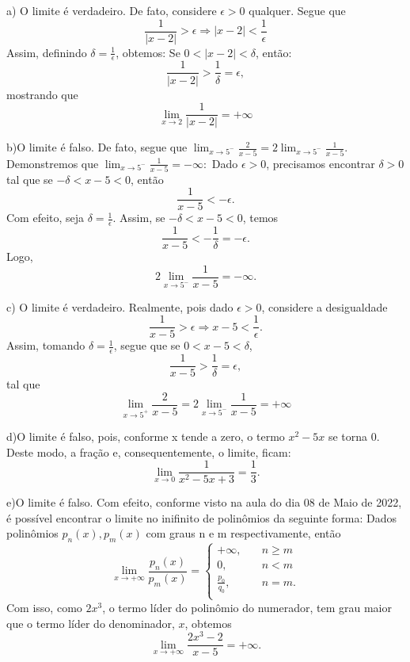 \documentclass[exercícios_de_cálculo.tex]{subfiles}
\begin{document}
\begin{sol*}
	a) O limite é verdadeiro. De fato, considere $\epsilon > 0$ qualquer. Segue que
	$$
		\frac{1}{|x - 2|} > \epsilon \Rightarrow |x - 2| < \frac{1}{\epsilon}
	$$
	Assim, definindo $\delta = \frac{1}{\epsilon}$, obtemos: Se $0 < |x - 2| < \delta$, então:
	$$
		\frac{1}{|x - 2|} > \frac{1}{\delta} = \epsilon,
	$$
	mostrando que
	$$
		\lim_{x\to2}\frac{1}{|x - 2|}=+\infty
	$$

	b)O limite é falso. De fato, segue que  $\lim_{x\to5^-}\frac{2}{x - 5} = 2\lim_{x\to5^-}\frac{1}{x - 5}.$ Demonstremos que $\lim_{x\to5^-}\frac{1}{x - 5} = -\infty:$ Dado $\epsilon > 0$, precisamos encontrar $\delta > 0$ tal que se $-\delta < x - 5< 0$, então
	$$
		\frac{1}{x - 5} < -\epsilon.
	$$
	Com efeito, seja $\delta = \frac{1}{\epsilon}.$ Assim, se $-\delta < x - 5< 0$, temos
	$$
		\frac{1}{x - 5} < -\frac{1}{\delta} = -\epsilon.
	$$
	Logo,
	$$
		2\lim_{x\to5^-}\frac{1}{x - 5} = -\infty.
	$$

	c) O limite é verdadeiro. Realmente, pois dado $\epsilon > 0$, considere a desigualdade
	$$
		\frac{1}{x - 5} > \epsilon \Rightarrow x - 5 < \frac{1}{\epsilon}.
	$$
	Assim, tomando $\delta = \frac{1}{\epsilon}$, segue que se $0 < x - 5 < \delta$,
	$$
		\frac{1}{x - 5} > \frac{1}{\delta} = \epsilon,
	$$
	tal que
	$$
		\lim_{x\to5^+}\frac{2}{x - 5} = 2\lim_{x\to5^-}\frac{1}{x - 5} = +\infty
	$$

	d)O limite é falso, pois, conforme x tende a zero, o termo $x^2 - 5x$ se torna 0. Deste modo, a fração e, consequentemente, o limite, ficam:
	$$
		\lim_{x\to0}\frac{1}{x^2 - 5x + 3} = \frac{1}{3}.
	$$

	e)O limite é falso. Com efeito, conforme visto na aula do dia 08 de Maio de 2022, é possível encontrar o limite no inifinito de polinômios da seguinte forma: Dados polinômios $p_n(x), p_m(x)$ com graus n e m respectivamente, então
	$$
		\lim_{x\to+\infty}\frac{p_n(x)}{p_m(x)} =
		\left\{\begin{array}{ll}
			+\infty,         & \quad n\geq{m} \\
			0,               & \quad n < m    \\
			\frac{p_0}{q_0}, & \quad n = m.   \\
		\end{array}\right.
	$$
	Com isso, como $2x^3$, o termo líder do polinômio do numerador, tem grau maior que o termo l\'ider do denominador, $x$, obtemos
	$$
		\lim_{x\to+\infty}\frac{2x^3 - 2}{x-5} = +\infty.
	$$
	\qedsymbol
\end{sol*}
\end{document}
